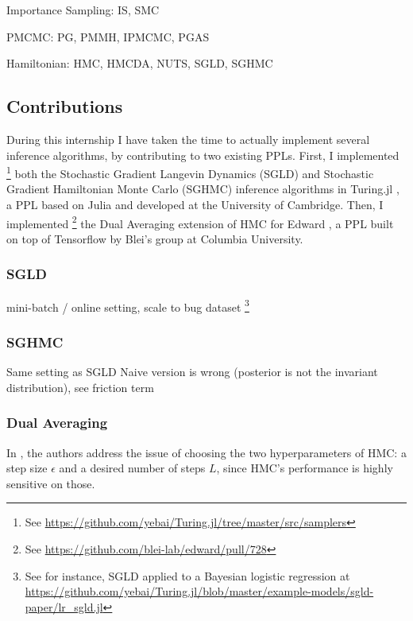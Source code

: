 Importance Sampling: IS, SMC

PMCMC: PG, PMMH, IPMCMC, PGAS

Hamiltonian: HMC, HMCDA, NUTS, SGLD, SGHMC

\subsection{Contributions}
\quad During this internship I have taken the time to actually implement several inference algorithms, by contributing to two existing PPLs.
First, I implemented \footnote{See \url{https://github.com/yebai/Turing.jl/tree/master/src/samplers}} both the Stochastic Gradient Langevin Dynamics (SGLD) and Stochastic Gradient Hamiltonian Monte Carlo (SGHMC) inference algorithms in Turing.jl \cite{Turing}, a PPL based on Julia and developed at the University of Cambridge.
Then, I implemented \footnote{See \url{https://github.com/blei-lab/edward/pull/728}} the Dual Averaging extension of HMC \cite{HMC} for Edward \cite{Edward}, a PPL built on top of Tensorflow \cite{Tensorflow} by Blei's group at Columbia University.

\subsubsection{SGLD}
mini-batch / online setting, scale to bug dataset
\footnote{See for instance, SGLD applied to a Bayesian logistic regression at \url{https://github.com/yebai/Turing.jl/blob/master/example-models/sgld-paper/lr_sgld.jl}}
 \cite{SGLD}
 
\subsubsection{SGHMC}
Same setting as SGLD
Naive version is wrong (posterior is not the invariant distribution), see \cite{SGMCMC}
friction term
 \cite{SGHMC}
 
\subsubsection{Dual Averaging}
In \cite{NUTS}, the authors address the issue of choosing the two hyperparameters of HMC: a step size $\epsilon$ and a desired number of steps $L$, since HMC’s performance is highly sensitive on those.
\cite{Nesterov2009}
